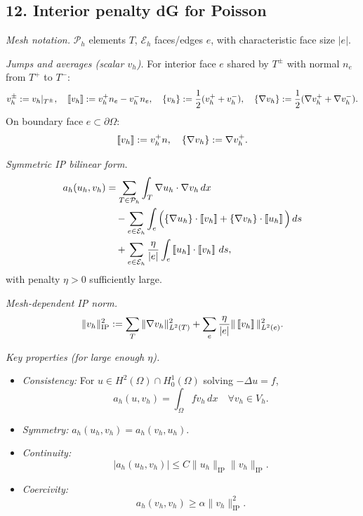\subsection*{12. Interior penalty dG for Poisson}

\emph{Mesh notation.}
$\mathcal{P}_h$ elements $T$, $\mathcal{E}_h$ faces/edges $e$, with characteristic face size $|e|$.

\emph{Jumps and averages (scalar $v_h$).}
For interior face $e$ shared by $T^\pm$ with normal $n_e$ from $T^+$ to $T^-$:
\[
    v_h^\pm := v_h|_{T^\pm},
    \quad
    \left[\!\left[ v_h \right]\!\right] := v_h^+ n_e - v_h^- n_e,
    \quad
    \{v_h\} := \frac{1}{2}(v_h^+ + v_h^-),
    \quad
    \{\nabla v_h\} := \frac{1}{2}(\nabla v_h^+ + \nabla v_h^-).
\]
On boundary face $e\subset\partial\Omega$:
\[
    \left[\!\left[ v_h \right]\!\right] := v_h^+ n,\quad \{\nabla v_h\}:=\nabla v_h^+.
\]

\emph{Symmetric IP bilinear form.}
\[
    \begin{aligned}
        a_h(u_h,v_h)
         & = \sum_{T\in\mathcal{P}_h}\int_T \nabla u_h\cdot\nabla v_h\,dx                        \\
         & \quad - \sum_{e\in\mathcal{E}_h}\int_e
        \Big(\{\nabla u_h\}\cdot\jump{v_h} + \{\nabla v_h\}\cdot\jump{u_h}\Big)\,ds              \\
         & \quad + \sum_{e\in\mathcal{E}_h}\frac{\eta}{|e|}\int_e \jump{u_h}\cdot\jump{v_h}\,ds,
    \end{aligned}
\]
with penalty $\eta>0$ sufficiently large.

\emph{Mesh-dependent IP norm.}
\[
    \|v_h\|_{\mathrm{IP}}^2
    := \sum_{T}\|\nabla v_h\|_{L^2(T)}^2
    + \sum_{e}\frac{\eta}{|e|}\|\left[\!\left[ v_h \right]\!\right]\|_{L^2(e)}^2.
\]

\emph{Key properties (for large enough $\eta$).}
\begin{itemize}
    \item \emph{Consistency:} For $u\in H^2(\Omega)\cap H_0^1(\Omega)$ solving $-\Delta u=f$,
          \[
              a_h(u,v_h) = \int_\Omega f v_h\,dx\quad\forall v_h\in V_h.
          \]
    \item \emph{Symmetry:} $a_h(u_h,v_h)=a_h(v_h,u_h)$.
    \item \emph{Continuity:}
          \[
              |a_h(u_h,v_h)| \le C \|u_h\|_{\mathrm{IP}}\|v_h\|_{\mathrm{IP}}.
          \]
    \item \emph{Coercivity:}
          \[
              a_h(v_h,v_h) \ge \alpha \|v_h\|_{\mathrm{IP}}^2.
          \]
\end{itemize}

